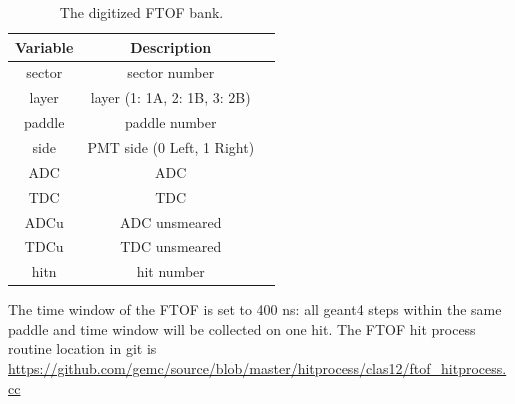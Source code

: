 \begin{table}[h]
	\begin{center}
		\begin{tabular}{| c | c | c |}
			\hline \hline
			Variable  & Description                                 \\
			\hline
              sector  &                             sector number   \\
               layer  &               layer (1: 1A, 2: 1B, 3: 2B)   \\
              paddle  &                             paddle number   \\
                side  &                PMT side (0 Left, 1 Right)   \\
                 ADC  &                                       ADC   \\
                 TDC  &                                       TDC   \\
                ADCu  &                             ADC unsmeared   \\
                TDCu  &                             TDC unsmeared   \\
                hitn  &                                hit number   \\
			\hline \hline
		\end{tabular}
	\end{center}
	\caption{The digitized FTOF bank.}\label{tab:ftofBank}
\end{table}


The time window  of the FTOF is set to 400 ns: all geant4 steps within the same paddle and time window will be collected on one hit.
The FTOF hit process routine location in git is \url{https://github.com/gemc/source/blob/master/hitprocess/clas12/ftof_hitprocess.cc}


